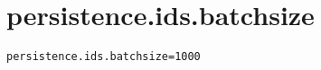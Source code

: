 \section{persistence.ids.batchsize}
\label{configuration:PersistenceIdsBatchsize}
\AvailableInJavaOnly{\TODO}
\begin{lstlisting}[style=Props,caption={Usage example for \textit{persistence.ids.batchsize}}]
persistence.ids.batchsize=1000
\end{lstlisting}